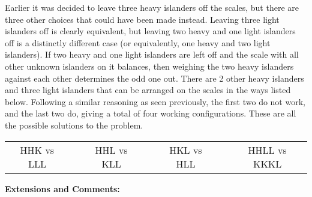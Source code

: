 Earlier it was decided to leave three heavy islanders off the scales, but there are three other choices that could have been made instead. Leaving three light islanders off is clearly equivalent, but leaving two heavy and one light islanders off is a distinctly different case (or equivalently, one heavy and two light islanders). If two heavy and one light islanders are left off and the scale with all other unknown islanders on it balances, then weighing the two heavy islanders against each other determines the odd one out. There are 2 other heavy islanders and three light islanders that can be arranged on the scales in the ways listed below. Following a similar reasoning as seen previously, the first two do not work, and the last two do, giving a total of four working configurations. These are all the possible solutions to the problem.

\begin{table}[H]
    \centering
    \begin{tabular}{ccccccc}
        HHK vs LLL & & HHL vs KLL & & HKL vs HLL & & HHLL vs KKKL
    \end{tabular}
\end{table}

\textbf{Extensions and Comments:}